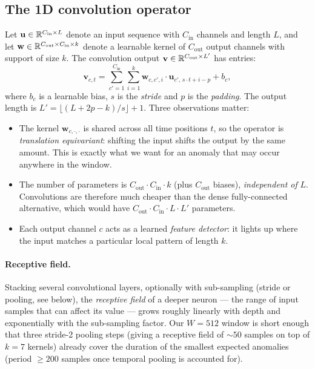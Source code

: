 \subsection{The 1D convolution operator}
\label{sec:conv-theory}

Let $\mathbf{u} \in \mathbb{R}^{C_{\text{in}} \times L}$ denote an input
sequence with $C_{\text{in}}$ channels and length $L$, and let
$\mathbf{w} \in \mathbb{R}^{C_{\text{out}} \times C_{\text{in}} \times k}$
denote a learnable kernel of $C_{\text{out}}$ output channels with
support of size $k$. The convolution output
$\mathbf{v} \in \mathbb{R}^{C_{\text{out}} \times L'}$ has entries:
\begin{equation}
    \mathbf{v}_{c, t} = \sum_{c'=1}^{C_{\text{in}}} \sum_{i=1}^{k}
        \mathbf{w}_{c, c', i} \cdot \mathbf{u}_{c', \, s \cdot t + i - p} + b_c,
    \label{eq:conv-theory}
\end{equation}
where $b_c$ is a learnable bias, $s$ is the \emph{stride} and $p$ is the
\emph{padding}. The output length is
$L' = \lfloor (L + 2p - k)/s \rfloor + 1$. Three observations matter:
\begin{itemize}[leftmargin=*, itemsep=0.2em]
    \item The kernel $\mathbf{w}_{c, \cdot, \cdot}$ is shared across all
    time positions $t$, so the operator is \emph{translation
    equivariant}: shifting the input shifts the output by the same
    amount. This is exactly what we want for an anomaly that may occur
    anywhere in the window.
    \item The number of parameters is $C_{\text{out}} \cdot C_{\text{in}} \cdot k$
    (plus $C_{\text{out}}$ biases), \emph{independent of} $L$. Convolutions
    are therefore much cheaper than the dense fully-connected
    alternative, which would have $C_{\text{out}} \cdot C_{\text{in}} \cdot L \cdot L'$
    parameters.
    \item Each output channel $c$ acts as a learned \emph{feature
    detector}: it lights up where the input matches a particular local
    pattern of length $k$.
\end{itemize}

\paragraph{Receptive field.}
Stacking several convolutional layers, optionally with sub-sampling
(stride or pooling, see below), the \emph{receptive field} of a deeper
neuron --- the range of input samples that can affect its value ---
grows roughly linearly with depth and exponentially with the
sub-sampling factor. Our $W=512$ window is short enough that three
stride-2 pooling steps (giving a receptive field of $\sim 50$ samples on
top of $k=7$ kernels) already cover the duration of the smallest
expected anomalies (period $\geq 200$ samples once temporal pooling is
accounted for).

